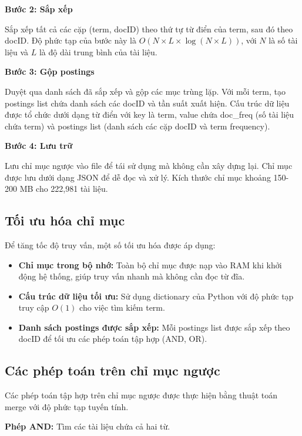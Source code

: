 \documentclass[../BTL.tex]{subfiles}
\begin{document}
\textbf{Bước 2: Sắp xếp}

Sắp xếp tất cả các cặp (term, docID) theo thứ tự từ điển của term, sau đó theo docID. Độ phức tạp của bước này là $O(N \times L \times \log(N \times L))$, với $N$ là số tài liệu và $L$ là độ dài trung bình của tài liệu.

\textbf{Bước 3: Gộp postings}

Duyệt qua danh sách đã sắp xếp và gộp các mục trùng lặp. Với mỗi term, tạo postings list chứa danh sách các docID và tần suất xuất hiện. Cấu trúc dữ liệu được tổ chức dưới dạng từ điển với key là term, value chứa doc\_freq (số tài liệu chứa term) và postings list (danh sách các cặp docID và term frequency).

\textbf{Bước 4: Lưu trữ}

Lưu chỉ mục ngược vào file để tái sử dụng mà không cần xây dựng lại. Chỉ mục được lưu dưới dạng JSON để dễ đọc và xử lý. Kích thước chỉ mục khoảng 150-200 MB cho 222,981 tài liệu.

\subsection{Tối ưu hóa chỉ mục}

Để tăng tốc độ truy vấn, một số tối ưu hóa được áp dụng:

\begin{itemize}
    \item \textbf{Chỉ mục trong bộ nhớ:} Toàn bộ chỉ mục được nạp vào RAM khi khởi động hệ thống, giúp truy vấn nhanh mà không cần đọc từ đĩa.
    
    \item \textbf{Cấu trúc dữ liệu tối ưu:} Sử dụng dictionary của Python với độ phức tạp truy cập $O(1)$ cho việc tìm kiếm term.
    
    \item \textbf{Danh sách postings được sắp xếp:} Mỗi postings list được sắp xếp theo docID để tối ưu các phép toán tập hợp (AND, OR).
\end{itemize}

\subsection{Các phép toán trên chỉ mục ngược}

Các phép toán tập hợp trên chỉ mục ngược được thực hiện bằng thuật toán merge với độ phức tạp tuyến tính.

\textbf{Phép AND:} Tìm các tài liệu chứa cả hai từ.
\end{document}
